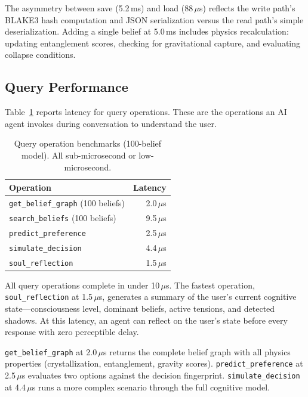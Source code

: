 \documentclass[10pt, twocolumn]{article}
\begin{document}
The asymmetry between save (5.2\,ms) and load (88\,$\mu$s) reflects the write path's BLAKE3 hash computation and JSON serialization versus the read path's simple deserialization. Adding a single belief at 5.0\,ms includes physics recalculation: updating entanglement scores, checking for gravitational capture, and evaluating collapse conditions.

\subsection{Query Performance}
\label{sec:query_bench}

Table~\ref{tab:query_bench} reports latency for query operations. These are the operations an AI agent invokes during conversation to understand the user.

\begin{table}[t]
\centering
\caption{Query operation benchmarks (100-belief model). All sub-microsecond or low-microsecond.}
\label{tab:query_bench}
\footnotesize
\begin{tabular}{lr}
\toprule
\textbf{Operation} & \textbf{Latency} \\
\midrule
\texttt{get\_belief\_graph} (100 beliefs) & 2.0\,$\mu$s \\
\texttt{search\_beliefs} (100 beliefs) & 9.5\,$\mu$s \\
\texttt{predict\_preference} & 2.5\,$\mu$s \\
\texttt{simulate\_decision} & 4.4\,$\mu$s \\
\texttt{soul\_reflection} & 1.5\,$\mu$s \\
\bottomrule
\end{tabular}
\end{table}

All query operations complete in under 10\,$\mu$s. The fastest operation, \texttt{soul\_reflection} at 1.5\,$\mu$s, generates a summary of the user's current cognitive state---consciousness level, dominant beliefs, active tensions, and detected shadows. At this latency, an agent can reflect on the user's state before every response with zero perceptible delay.

\texttt{get\_belief\_graph} at 2.0\,$\mu$s returns the complete belief graph with all physics properties (crystallization, entanglement, gravity scores). \texttt{predict\_preference} at 2.5\,$\mu$s evaluates two options against the decision fingerprint. \texttt{simulate\_decision} at 4.4\,$\mu$s runs a more complex scenario through the full cognitive model.
\end{document}
